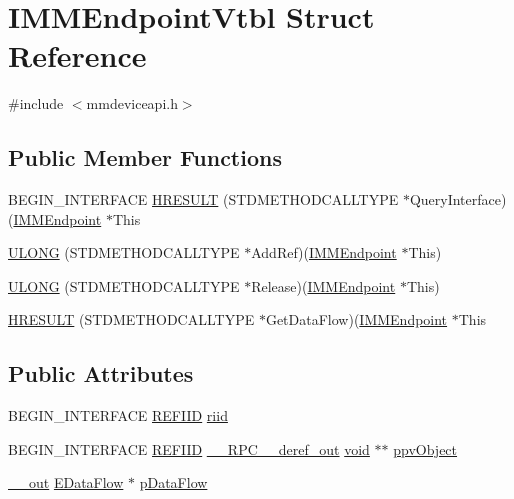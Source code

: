 \hypertarget{struct_i_m_m_endpoint_vtbl}{}\section{I\+M\+M\+Endpoint\+Vtbl Struct Reference}
\label{struct_i_m_m_endpoint_vtbl}


{\ttfamily \#include $<$mmdeviceapi.\+h$>$}

\subsection*{Public Member Functions}
\begin{DoxyCompactItemize}
\item 
B\+E\+G\+I\+N\+\_\+\+I\+N\+T\+E\+R\+F\+A\+CE \hyperlink{struct_i_m_m_endpoint_vtbl_a5cfeed999302c85a261f7eb6015671e0}{H\+R\+E\+S\+U\+LT} (S\+T\+D\+M\+E\+T\+H\+O\+D\+C\+A\+L\+L\+T\+Y\+PE $\ast$Query\+Interface)(\hyperlink{mmdeviceapi_8h_a32d63499f58b0065348b8c09c18d9f36}{I\+M\+M\+Endpoint} $\ast$This
\item 
\hyperlink{struct_i_m_m_endpoint_vtbl_a71eca19ff1aacfa66c60d34bc6bacd23}{U\+L\+O\+NG} (S\+T\+D\+M\+E\+T\+H\+O\+D\+C\+A\+L\+L\+T\+Y\+PE $\ast$Add\+Ref)(\hyperlink{mmdeviceapi_8h_a32d63499f58b0065348b8c09c18d9f36}{I\+M\+M\+Endpoint} $\ast$This)
\item 
\hyperlink{struct_i_m_m_endpoint_vtbl_aa711597b5ec0620e1a29fe0be01bb1d8}{U\+L\+O\+NG} (S\+T\+D\+M\+E\+T\+H\+O\+D\+C\+A\+L\+L\+T\+Y\+PE $\ast$Release)(\hyperlink{mmdeviceapi_8h_a32d63499f58b0065348b8c09c18d9f36}{I\+M\+M\+Endpoint} $\ast$This)
\item 
\hyperlink{struct_i_m_m_endpoint_vtbl_ad14e826d7e3e21ee4abeb23c394b2fce}{H\+R\+E\+S\+U\+LT} (S\+T\+D\+M\+E\+T\+H\+O\+D\+C\+A\+L\+L\+T\+Y\+PE $\ast$Get\+Data\+Flow)(\hyperlink{mmdeviceapi_8h_a32d63499f58b0065348b8c09c18d9f36}{I\+M\+M\+Endpoint} $\ast$This
\end{DoxyCompactItemize}
\subsection*{Public Attributes}
\begin{DoxyCompactItemize}
\item 
B\+E\+G\+I\+N\+\_\+\+I\+N\+T\+E\+R\+F\+A\+CE \hyperlink{px__win__ds_8c_a80ec49c8ae61e234197d5071d2df497d}{R\+E\+F\+I\+ID} \hyperlink{struct_i_m_m_endpoint_vtbl_a3eea108bf7193a030103beee6b01aaa7}{riid}
\item 
B\+E\+G\+I\+N\+\_\+\+I\+N\+T\+E\+R\+F\+A\+CE \hyperlink{px__win__ds_8c_a80ec49c8ae61e234197d5071d2df497d}{R\+E\+F\+I\+ID} \hyperlink{rpcsal_8h_a23bc188526f10656f9c79d950f6c3192}{\+\_\+\+\_\+\+R\+P\+C\+\_\+\+\_\+deref\+\_\+out} \hyperlink{sound_8c_ae35f5844602719cf66324f4de2a658b3}{void} $\ast$$\ast$ \hyperlink{struct_i_m_m_endpoint_vtbl_a6bada0d8ac9a49cfef25c84e92df4b57}{ppv\+Object}
\item 
\hyperlink{sal_8h_abb4c3c1135aab6c47cff22e7c16efb74}{\+\_\+\+\_\+out} \hyperlink{mmdeviceapi_8h_a9f6154b3634cb3b90d016eced3882206}{E\+Data\+Flow} $\ast$ \hyperlink{struct_i_m_m_endpoint_vtbl_a8795b52aa75ffa107730d78ec59c7d70}{p\+Data\+Flow}
\end{DoxyCompactItemize}


